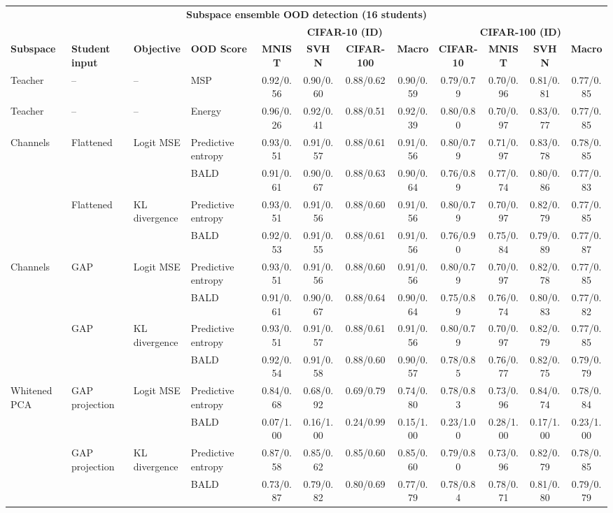 \documentclass[border=2pt]{standalone}
\begin{document}
\scriptsize
\setlength{\tabcolsep}{4pt}
\begin{tabular}{llllcccccccc}
\multicolumn{12}{c}{\textbf{Subspace ensemble OOD detection (16 students)}}\\[4pt]
& & & & \multicolumn{4}{c}{\textbf{CIFAR-10 (ID)}} & \multicolumn{4}{c}{\textbf{CIFAR-100 (ID)}} \\
\cmidrule(lr){5-8}\cmidrule(lr){9-12}
\textbf{Subspace} & \textbf{Student input} & \textbf{Objective} & \textbf{OOD Score}
& \textbf{MNIST} & \textbf{SVHN} & \textbf{CIFAR-100} & \textbf{Macro}
& \textbf{CIFAR-10} & \textbf{MNIST} & \textbf{SVHN} & \textbf{Macro} \\
\midrule
Teacher & -- & -- & MSP
& 0.92/0.56 & 0.90/0.60 & 0.88/0.62 & 0.90/0.59
& 0.79/0.79 & 0.70/0.96 & 0.81/0.81 & 0.77/0.85 \\
Teacher & -- & -- & Energy
& 0.96/0.26 & 0.92/0.41 & 0.88/0.51 & 0.92/0.39
& 0.80/0.80 & 0.70/0.97 & 0.83/0.77 & 0.77/0.85 \\
\midrule
Channels & Flattened & Logit MSE & Predictive entropy
& 0.93/0.51 & 0.91/0.57 & 0.88/0.61 & 0.91/0.56
& 0.80/0.79 & 0.71/0.97 & 0.83/0.78 & 0.78/0.85 \\
& & & BALD
& 0.91/0.61 & 0.90/0.67 & 0.88/0.63 & 0.90/0.64
& 0.76/0.89 & 0.77/0.74 & 0.80/0.86 & 0.77/0.83 \\
\addlinespace
& Flattened & KL divergence & Predictive entropy
& 0.93/0.51 & 0.91/0.56 & 0.88/0.60 & 0.91/0.56
& 0.80/0.79 & 0.70/0.97 & 0.82/0.79 & 0.77/0.85 \\
& & & BALD
& 0.92/0.53 & 0.91/0.55 & 0.88/0.61 & 0.91/0.56
& 0.76/0.90 & 0.75/0.84 & 0.79/0.89 & 0.77/0.87 \\
\midrule
Channels & GAP & Logit MSE & Predictive entropy
& 0.93/0.51 & 0.91/0.56 & 0.88/0.60 & 0.91/0.56
& 0.80/0.79 & 0.70/0.97 & 0.82/0.78 & 0.77/0.85 \\
& & & BALD
& 0.91/0.61 & 0.90/0.67 & 0.88/0.64 & 0.90/0.64
& 0.75/0.89 & 0.76/0.74 & 0.80/0.83 & 0.77/0.82 \\
\addlinespace
& GAP & KL divergence & Predictive entropy
& 0.93/0.51 & 0.91/0.57 & 0.88/0.61 & 0.91/0.56
& 0.80/0.79 & 0.70/0.97 & 0.82/0.79 & 0.77/0.85 \\
& & & BALD
& 0.92/0.54 & 0.91/0.58 & 0.88/0.60 & 0.90/0.57
& 0.78/0.85 & 0.76/0.77 & 0.82/0.75 & 0.79/0.79 \\
\midrule
Whitened PCA & GAP projection & Logit MSE & Predictive entropy
& 0.84/0.68 & 0.68/0.92 & 0.69/0.79 & 0.74/0.80
& 0.78/0.83 & 0.73/0.96 & 0.84/0.74 & 0.78/0.84 \\
& & & BALD
& 0.07/1.00 & 0.16/1.00 & 0.24/0.99 & 0.15/1.00
& 0.23/1.00 & 0.28/1.00 & 0.17/1.00 & 0.23/1.00 \\
\addlinespace
& GAP projection & KL divergence & Predictive entropy
& 0.87/0.58 & 0.85/0.62 & 0.85/0.60 & 0.85/0.60
& 0.79/0.80 & 0.73/0.96 & 0.82/0.79 & 0.78/0.85 \\
& & & BALD
& 0.73/0.87 & 0.79/0.82 & 0.80/0.69 & 0.77/0.79
& 0.78/0.84 & 0.78/0.71 & 0.81/0.80 & 0.79/0.79 \\
\bottomrule
\end{tabular}
\end{document}
